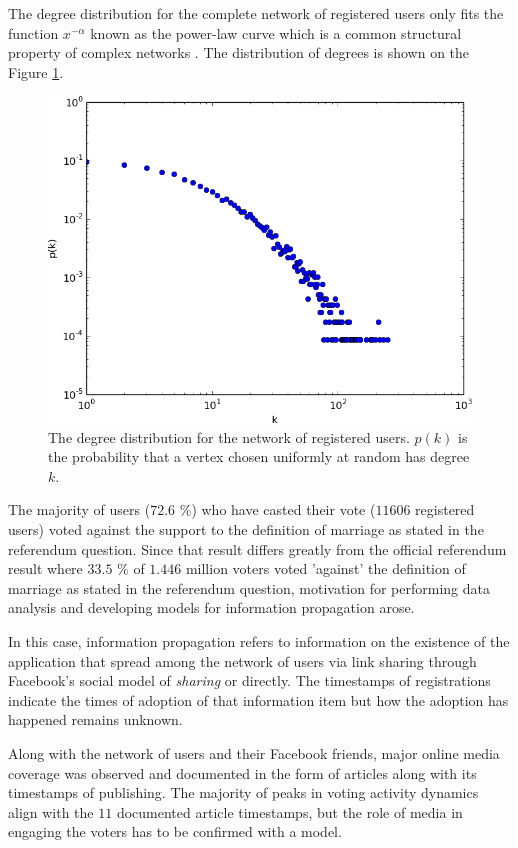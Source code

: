 \documentclass[times, utf8, zavrsni]{fer}
\begin{document}
The degree distribution for the complete network of registered users only fits the function $x^{-\alpha}$ known as the power-law curve which is a common structural property of complex networks \cite{Newman03thestructure}. The distribution of degrees is shown on the Figure \ref{degs}.

\begin{figure}[htp]
\centering
\includegraphics[scale=0.6]{log_mali.png}	
\caption{The degree distribution for the network of registered users. $p(k)$ is the probability that a vertex chosen uniformly at random has degree $k$.}
\label{degs}
\end{figure}

 The majority of users ($72.6$ \%)  who have casted their vote ($11606$ registered users) voted against the support to the definition of marriage as stated in the referendum question. Since that result differs greatly from the official referendum result where $33.5$ \% of $1.446$ million voters voted 'against' the definition of marriage as stated in the referendum question, motivation for performing data analysis and developing models for information propagation arose. 
 
 In this case, information propagation refers to  information on the existence of the application that  spread among the network of users via link sharing through Facebook's social model of \emph{sharing} or directly. The timestamps of registrations indicate the times of adoption of that information item but how the adoption has happened remains unknown.  
   
 Along with the network of users and their Facebook friends, major online media coverage was observed and documented in the form of articles  along with its timestamps of publishing. The majority of peaks in voting activity dynamics align with the $11$ documented article timestamps, but the role of media in engaging the voters has to be confirmed with a model.  
 
\end{document}
